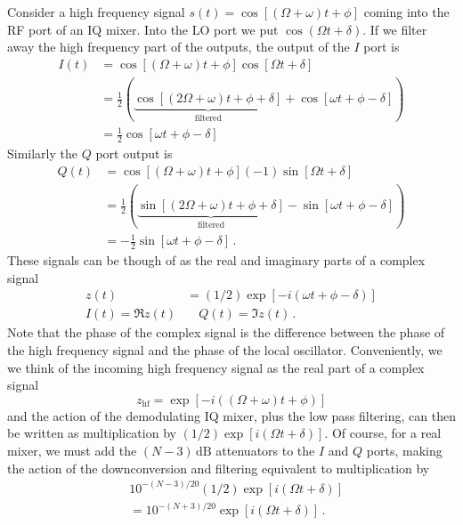 Consider a high frequency signal $s(t) = \cos [ (\Omega+\omega)t + \phi ]$ coming into the RF port of an IQ mixer.
Into the LO port we put $\cos(\Omega t + \delta)$.
If we filter away the high frequency part of the outputs, the output of the $I$ port is
\begin{align}
I(t) &= \cos [ (\Omega + \omega)t + \phi ] \cos [ \Omega t + \delta ] \nonumber \\
&= \frac{1}{2}\left( \underbrace{\cos [(2\Omega + \omega)t + \phi + \delta ]}_\text{filtered} + \cos [ \omega t + \phi - \delta ] \right) \nonumber \\
&= \frac{1}{2} \cos [ \omega t + \phi - \delta ]
\end{align}
Similarly the $Q$ port output is
\begin{align}
Q(t) &= \cos [ (\Omega + \omega)t + \phi ](-1)\sin [ \Omega t + \delta ] \nonumber \\
&= \frac{1}{2}\left( \underbrace{\sin [(2\Omega + \omega)t + \phi + \delta ]}_\text{filtered} - \sin [ \omega t + \phi - \delta ] \right) \nonumber \\
&= - \frac{1}{2} \sin [ \omega t + \phi - \delta ] \, .
\end{align}
These signals can be though of as the real and imaginary parts of a complex signal
\begin{align}
z(t) &= (1/2) \exp \left[-i \left( \omega t + \phi - \delta \right) \right] \\
I(t) = \Re z(t) & \quad Q(t) = \Im z(t) \, .
\end{align}
Note that the phase of the complex signal is the difference between the phase of the high frequency signal and the phase of the local oscillator.
Conveniently, we we think of the incoming high frequency signal as the real part of a complex signal
\begin{equation}
z_{\textrm{hf}} = \exp \left[ -i \left( \left( \Omega + \omega \right)t +\phi \right) \right]
\end{equation}
and the action of the demodulating IQ mixer, plus the low pass filtering, can then be written as multiplication by $(1/2) \exp \left[ i( \Omega t + \delta ) \right]$.
Of course, for a real mixer, we must add the $(N-3)\,\text{dB}$ attenuators to the $I$ and $Q$ ports, making the action of the downconversion and filtering equivalent to multiplication by
\begin{align*}
& 10^{-(N-3)/20} (1/2) \exp \left[ i (\Omega t + \delta) \right] \\
&= 10^{-(N+3)/20} \exp \left[ i ( \Omega t + \delta) \right] \, .
\end{align*}

